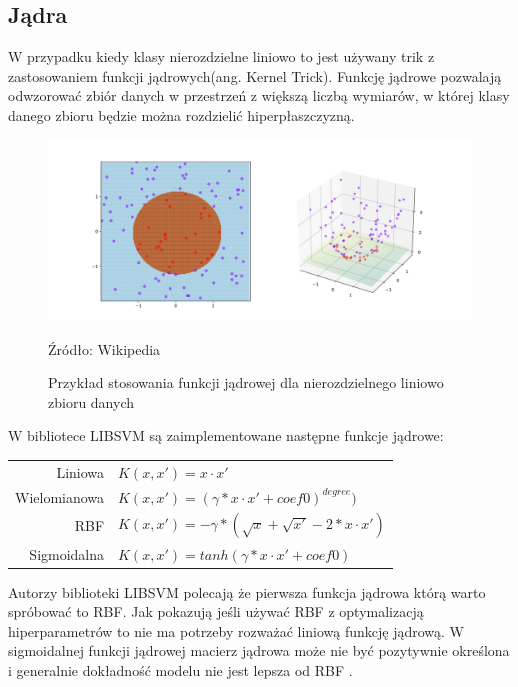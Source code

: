 \documentclass[paper=a4, fontsize=11pt]{scrartcl} %
\numberwithin{equation}{section} %
\numberwithin{figure}{section} %
\newcommand*{\captionsource}[2]{%
  \caption[{#1}]{%
      #1}
    Źródło: #2%
}
\begin{document}
\subsection{Jądra}
    \par W przypadku kiedy klasy nierozdzielne liniowo to jest używany trik z zastosowaniem
    funkcji jądrowych(ang. Kernel Trick). Funkcję jądrowe pozwalają odwzorować zbiór danych
    w przestrzeń z większą liczbą wymiarów, w której klasy danego zbioru będzie można rozdzielić
    hiperpłaszczyzną. 

    \begin{figure}[h]
        \begin{center}
            \includegraphics[scale=0.2]{./img/kernel_trick.png}
        \captionsource{Przykład stosowania funkcji jądrowej dla nierozdzielnego liniowo zbioru
        danych}{Wikipedia}
        \label{fig:kernel_trick}
        \end{center}
    \end{figure}

    \newpage 

    \par W bibliotece LIBSVM są zaimplementowane następne funkcje jądrowe:

    \begin{center}
        \begin{tabular}{rl}
            Liniowa & $K(x,x') = x\cdot x'$\\
            Wielomianowa & $K(x,x') = (\gamma*x \cdot x'+coef0)^{degree})$\\
            RBF & $K(x,x') =  -\gamma * (\sqrt{x}+\sqrt{x'}-2 * x\cdot x')$ \\
            Sigmoidalna & $K(x,x') = tanh(\gamma*x \cdot x'+coef0)$
        \end{tabular}
    \end{center}

    \par Autorzy biblioteki LIBSVM polecają \cite{hsu2003practical} że pierwsza funkcja jądrowa
    którą warto spróbować to RBF.  Jak pokazują \cite{keerthi2003asymptotic} jeśli używać RBF z
    optymalizacją hiperparametrów to nie ma potrzeby rozważać liniową funkcję jądrową. W sigmoidalnej
    funkcji jądrowej macierz jądrowa może nie być pozytywnie określona i generalnie dokładność modelu
    nie jest lepsza od RBF \cite{lin2003study}. 
\end{document}
